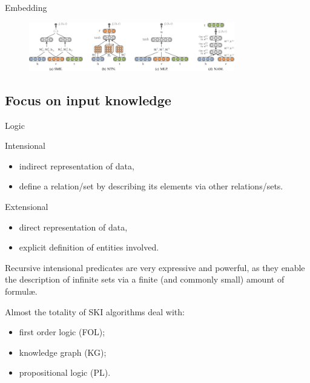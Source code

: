 \documentclass[presentation]{beamer}\mode<presentation>{\usetheme{AMSBolognaFC}}
\begin{document}
\begin{frame}[allowframebreaks]{Embedding}
    \begin{figure}
        \centering
        \includegraphics[width=0.8\textwidth]{figures/kge-nn-2.png}
    \end{figure}
    
\end{frame}

\subsection{Focus on input knowledge}

\begin{frame}[allowframebreaks]{Logic}
    \begin{block}{Intensional}
        \begin{itemize}
            \item indirect representation of data,
            \item define a relation/set by describing its elements via other relations/sets.
        \end{itemize}
    \end{block}
    \begin{block}{Extensional}
        \begin{itemize}
            \item direct representation of data,
            \item explicit definition of entities involved.
        \end{itemize}
    \end{block}
    
    Recursive intensional predicates are very expressive and powerful, as they enable the description of infinite sets via a finite (and commonly small) amount of formul\ae.
    
    \framebreak        
    
    Almost the totality of SKI algorithms deal with:
    \begin{itemize}
        \item \alert{first order logic} (FOL);
        \item \alert{knowledge graph} (KG);
        \item \alert{propositional logic} (PL).
        
    \end{itemize}
\end{frame}
    
\end{document}
